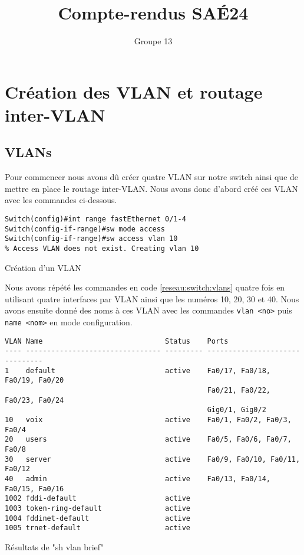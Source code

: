 \documentclass{article}
\author{Groupe 13}
\title{Compte-rendus SAÉ24}
\begin{document}
\maketitle
\tableofcontents
\listoffigures
\listoflistings

\newpage
\section{Création des VLAN et routage inter-VLAN}
\subsection{VLANs}
Pour commencer nous avons dû créer quatre VLAN sur notre switch ainsi que de mettre en place le routage inter-VLAN. 
Nous avons donc d'abord créé ces VLAN avec les commandes ci-dessous.
\begin{listing}[H]
    \begin{verbatim}
Switch(config)#int range fastEthernet 0/1-4
Switch(config-if-range)#sw mode access 
Switch(config-if-range)#sw access vlan 10
% Access VLAN does not exist. Creating vlan 10
    \end{verbatim}
    \caption{Création d'un VLAN}
    \label{reseau:switch:vlans}
\end{listing}
Nous avons répété les commandes en code \ref{reseau:switch:vlans} quatre fois en utilisant quatre interfaces par VLAN ainsi que les numéros 10, 20, 30 et 40. 
Nous avons ensuite donné des noms à ces VLAN avec les commandes \verb|vlan <no>| puis \verb|name <nom>| en mode configuration.

\begin{listing}[H]
    \begin{verbatim}
VLAN Name                             Status    Ports
---- -------------------------------- --------- -------------------------------
1    default                          active    Fa0/17, Fa0/18, Fa0/19, Fa0/20
                                                Fa0/21, Fa0/22, Fa0/23, Fa0/24
                                                Gig0/1, Gig0/2
10   voix                             active    Fa0/1, Fa0/2, Fa0/3, Fa0/4
20   users                            active    Fa0/5, Fa0/6, Fa0/7, Fa0/8
30   server                           active    Fa0/9, Fa0/10, Fa0/11, Fa0/12
40   admin                            active    Fa0/13, Fa0/14, Fa0/15, Fa0/16
1002 fddi-default                     active    
1003 token-ring-default               active    
1004 fddinet-default                  active    
1005 trnet-default                    active    
    \end{verbatim}
    \caption{Résultats de "sh vlan brief"}
    \label{reseau:switch:sh-vlan}
\end{listing}
\end{document}
